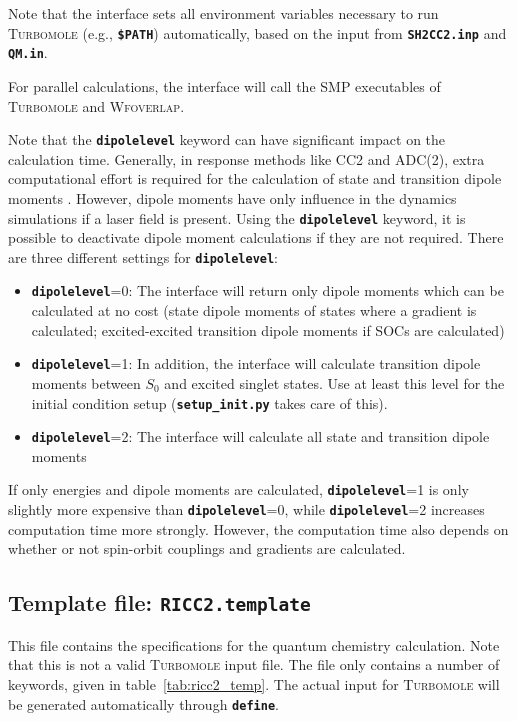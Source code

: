 \documentclass[a4paper,11pt,DIV=15,openany,twoside=false]{scrbook}
\newcommand{\ttt}[1]{\textbf{\texttt{#1}}}
\begin{document}
Note that the interface sets all environment variables necessary to run \textsc{Turbomole} (e.g., \ttt{\$PATH}) automatically, based on the input from \ttt{SH2CC2.inp} and \ttt{QM.in}.

For parallel calculations, the interface will call the SMP executables of \textsc{Turbomole} and \textsc{Wfoverlap}.

Note that the \ttt{dipolelevel} keyword can have significant impact on the calculation time.
Generally, in response methods like CC2 and ADC(2), extra computational effort is required for the calculation of state and transition dipole moments .
However, dipole moments have only influence in the dynamics simulations if a laser field is present.
Using the \ttt{dipolelevel} keyword, it is possible to deactivate dipole moment calculations if they are not required.
There are three different settings for \ttt{dipolelevel}: 
\begin{itemize}
  \item \ttt{dipolelevel}=0: The interface will return only dipole moments which can be calculated at no cost (state dipole moments of states where a gradient is calculated; excited-excited transition dipole moments if SOCs are calculated)
  \item \ttt{dipolelevel}=1: In addition, the interface will calculate transition dipole moments between $S_0$ and excited singlet states. Use at least this level for the initial condition setup (\ttt{setup\_init.py} takes care of this).
  \item \ttt{dipolelevel}=2: The interface will calculate all state and transition dipole moments
\end{itemize}
If only energies and dipole moments are calculated, \ttt{dipolelevel}=1 is only slightly more expensive than \ttt{dipolelevel}=0, while \ttt{dipolelevel}=2 increases computation time more strongly.
However, the computation time also depends on whether or not spin-orbit couplings and gradients are calculated. 



\subsection{Template file: \ttt{RICC2.template}}

This file contains the specifications for the quantum chemistry calculation. Note that this is not a valid \textsc{Turbomole} input file. The file only contains a number of keywords, given in table~\ref{tab:ricc2_temp}. The actual input for \textsc{Turbomole} will be generated automatically through \ttt{define}.
\end{document}
